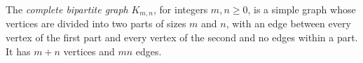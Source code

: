
The \emph{complete bipartite graph} $K_{m,n}$, for integers $m,n\ge0$, is a simple graph whose vertices are divided into two parts of sizes $m$ and $n$, with an edge between every vertex of the first part and every vertex of the second and no edges within a part. It has $m+n$ vertices and $mn$ edges.
